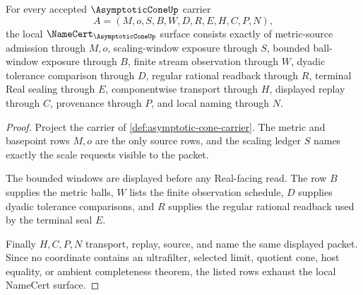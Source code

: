 \begin{theorem}
\label{thm:asymptotic-cone-namecert-obligations}
For every accepted $\AsymptoticConeUp$ carrier
$$
A=(M,o,S,B,W,D,R,E,H,C,P,N),
$$
the local $\NameCert_{\AsymptoticConeUp}$ surface consists exactly of metric-source admission through $M,o$, scaling-window exposure through $S$, bounded ball-window exposure through $B$, finite stream observation through $W$, dyadic tolerance comparison through $D$, regular rational readback through $R$, terminal Real sealing through $E$, componentwise transport through $H$, displayed replay through $C$, provenance through $P$, and local naming through $N$.
\end{theorem}
\begin{proof}
Project the carrier of \autoref{def:asymptotic-cone-carrier}. The metric and basepoint rows $M,o$ are the only source rows, and the scaling ledger $S$ names exactly the scale requests visible to the packet.

The bounded windows are displayed before any Real-facing read. The row $B$ supplies the metric balls, $W$ lists the finite observation schedule, $D$ supplies dyadic tolerance comparisons, and $R$ supplies the regular rational readback used by the terminal seal $E$.

Finally $H,C,P,N$ transport, replay, source, and name the same displayed packet. Since no coordinate contains an ultrafilter, selected limit, quotient cone, host equality, or ambient completeness theorem, the listed rows exhaust the local NameCert surface.
\end{proof}

